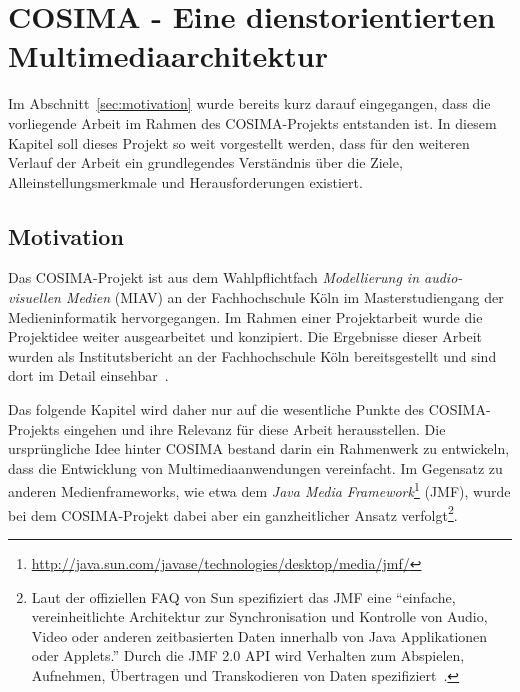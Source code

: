 
\chapter{COSIMA - Eine dienstorientierten Multimediaarchitektur} %
\label{cha:eine_dienstorientierten_multimediaarchitektur}

  Im Abschnitt~\ref{sec:motivation} wurde bereits kurz darauf eingegangen, dass die vorliegende Arbeit im Rahmen des COSIMA-Projekts entstanden ist. In diesem Kapitel soll dieses Projekt so weit vorgestellt werden, dass für den weiteren Verlauf der Arbeit ein grundlegendes Verständnis über die Ziele, Alleinstellungsmerkmale und Herausforderungen existiert.
  
\section{Motivation} %
\label{sec:motivation_cosima}

  Das COSIMA-Projekt ist aus dem Wahlpflichtfach \emph{Modellierung in audio-visuellen Medien} (MIAV) an der Fachhochschule Köln im Masterstudiengang der Medieninformatik hervorgegangen. Im Rahmen einer Projektarbeit wurde die Projektidee weiter ausgearbeitet und konzipiert. Die Ergebnisse dieser Arbeit wurden als Institutsbericht an der Fachhochschule Köln bereitsgestellt und sind dort im Detail einsehbar~\citep{bericht}.
  
  Das folgende Kapitel wird daher nur auf die wesentliche Punkte des COSIMA-Projekts eingehen und ihre Relevanz für diese Arbeit herausstellen. Die ursprüngliche Idee hinter COSIMA bestand darin ein Rahmenwerk zu entwickeln, dass die Entwicklung von Multimediaanwendungen vereinfacht. Im Gegensatz zu anderen Medienframeworks, wie etwa dem \emph{Java Media Framework}\footnote{\url{http://java.sun.com/javase/technologies/desktop/media/jmf/}} (JMF), wurde bei dem COSIMA-Projekt dabei aber ein ganzheitlicher Ansatz verfolgt\footnote{Laut der offiziellen FAQ von Sun spezifiziert das JMF eine "`einfache, vereinheitlichte Architektur zur Synchronisation und Kontrolle von Audio, Video oder anderen zeitbasierten Daten innerhalb von Java Applikationen oder Applets."' Durch die JMF 2.0 API wird Verhalten zum Abspielen, Aufnehmen, Übertragen und Transkodieren von Daten spezifiziert~\citep{jmf_faq}.}.
  
